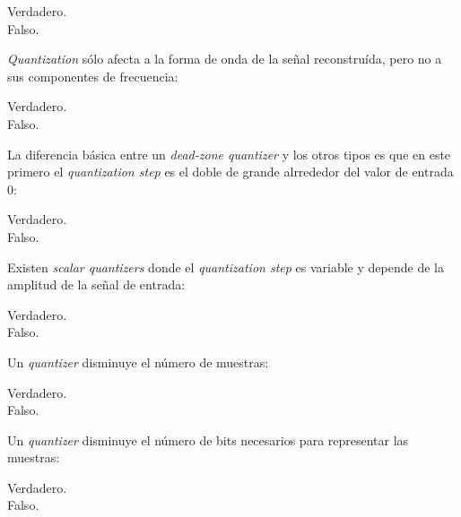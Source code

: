 \documentclass[legalpaper, 12pt, addpoints]{exam}
\begin{document}
\begin{questions}
\begin{oneparchoices}
  \choice Verdadero.\\
  \choice Falso.
\end{oneparchoices}
  
\vspace{0.10in}

\question \emph{Quantization} sólo afecta a la forma de onda de la señal
reconstruída, pero no a sus componentes de frecuencia:

\begin{oneparchoices}
  \choice Verdadero.\\
  \choice Falso.
\end{oneparchoices}
  
\vspace{0.10in}

\question La diferencia básica entre un \emph{dead-zone quantizer} y
los otros tipos es que en este primero el \emph{quantization step} es el
doble de grande alrrededor del valor de entrada 0:

\begin{oneparchoices}
  \choice Verdadero.\\
  \choice Falso.
\end{oneparchoices}
  
\vspace{0.10in}

\question Existen \emph{scalar quantizers} donde el \emph{quantization
  step} es variable y depende de la amplitud de la señal de entrada:

\begin{oneparchoices}
  \choice Verdadero.\\
  \choice Falso.
\end{oneparchoices}
  
\vspace{0.10in}

\question Un \emph{quantizer} disminuye el número de muestras:

\begin{oneparchoices}
  \choice Verdadero.\\
  \choice Falso.
\end{oneparchoices}
  
\vspace{0.10in}

\question Un \emph{quantizer} disminuye el número de bits necesarios para representar las muestras:

\begin{oneparchoices}
  \choice Verdadero.\\
  \choice Falso.
\end{oneparchoices}
  

\end{questions}
\end{document}
